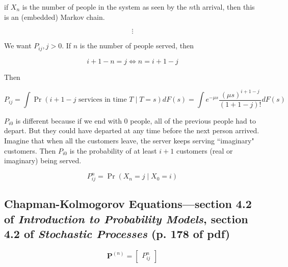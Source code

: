 \begin{example} if \(X_n\) is the number of people in the system as seen by the \(n\)th arrival, then this is an (embedded) Markov chain.

\[
\vdots
\]

We want \(P_{ij}, j > 0\). If \(n\) is the number of people served, then 

\[
i + 1 - n = j \iff n = i + 1 - j
\]

Then

\[
P_{ij} = \int \Pr(i + 1 - j \text{ services in time } T \mid T = s) dF(s) = \int e^{- \mu s} \frac{(\mu s)^{i+1-j}}{(1+1-j)!} dF(s) 
\]

\(P_{i0}\) is different because if we end with 0 people, all of the previous people had to depart. But they could have departed at any time before the next person arrived. Imagine that when all the customers leave, the server keeps serving ``imaginary" customers. Then \(P_{i0}\) is the probability of at least \(i+1\) customers (real or imaginary) being served.

\end{example}


\begin{definition}

\[
P_{ij}^n = \Pr(X_n = j \mid X_0 = i)
\]

\end{definition}

\subsection{Chapman-Kolmogorov Equations---section 4.2 of \textit{Introduction to Probability Models}, section 4.2 of \textit{Stochastic Processes} (p. 178 of pdf)}

\begin{proposition}

\end{proposition}

\begin{definition}

\[
\boldsymbol{P}^{(n)} = \begin{bmatrix}P_{ij}^n \end{bmatrix}
\]

\end{definition}

